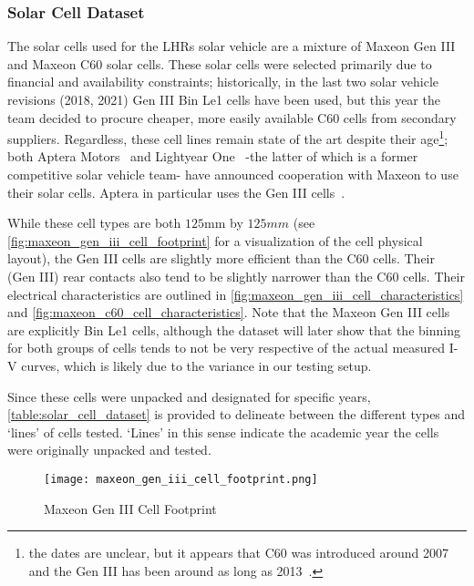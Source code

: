 \subsubsection{Solar Cell Dataset}\label{subsubsec:solar_cell_dataset}

The solar cells used for the \ac{LHRs} solar vehicle are a mixture of Maxeon Gen
III and Maxeon C60 solar cells. These solar cells were selected primarily due to
financial and availability constraints; historically, in the last two solar
vehicle revisions (2018, 2021) Gen III Bin Le1 cells have been used, but this
year the team decided to procure cheaper, more easily available C60 cells from
secondary suppliers. Regardless, these cell lines remain state of the art
despite their age\footnote{the dates are unclear, but it appears that C60 was
introduced around 2007~\cite{sunpower_history} and the Gen III has been around
as long as 2013~\cite{smith_et_al}.}; both Aptera
Motors~\cite{aptera_solar_cells} and Lightyear
One~\cite{lightyear_one_solar_cells} -the latter of which is a former
competitive solar vehicle team- have announced cooperation with Maxeon to use
their solar cells. Aptera in particular uses the Gen III
cells~\cite{aptera_solar_cells}.

While these cell types are both $125 \si{\mm}$ by $125 \si{mm}$ (see
\autoref{fig:maxeon_gen_iii_cell_footprint} for a visualization of the cell
physical layout), the Gen III cells are slightly more efficient than the C60
cells. Their (Gen III) rear contacts also tend to be slightly narrower than the
C60 cells. Their electrical characteristics are outlined in
\autoref{fig:maxeon_gen_iii_cell_characteristics} and
\autoref{fig:maxeon_c60_cell_characteristics}. Note that the Maxeon Gen III
cells are explicitly Bin Le1 cells, although the dataset will later show that
the binning for both groups of cells tends to not be very respective of the
actual measured \ac{I-V} curves, which is likely due to the variance in our
testing setup.

Since these cells were unpacked and designated for specific years,
\autoref{table:solar_cell_dataset} is provided to delineate between the
different types and `lines' of cells tested. `Lines' in this sense indicate
the academic year the cells were originally unpacked and tested.

\begin{figure}[!htbp]
    \texttt{[image: maxeon\_gen\_iii\_cell\_footprint.png]}
    \caption{Maxeon Gen III Cell Footprint}
    \label{fig:maxeon_gen_iii_cell_footprint}
\end{figure}

